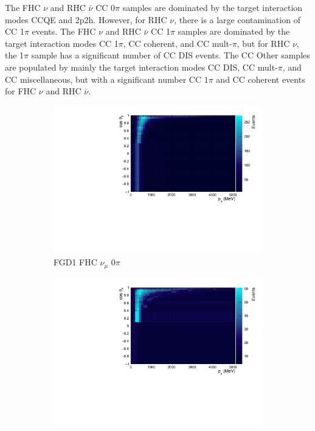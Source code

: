 The FHC $\nu$ and RHC $\bar{\nu}$ CC 0$\pi$ samples are dominated by the target interaction modes CCQE and 2p2h. However, for RHC $\nu$, there is a large contamination of CC 1$\pi$ events. The FHC $\nu$ and RHC $\bar{\nu}$ CC 1$\pi$ samples are dominated by the target interaction modes CC 1$\pi$, CC coherent, and CC mult-$\pi$, but for RHC $\nu$, the 1$\pi$ sample has a significant number of CC DIS events. The CC Other samples are populated by mainly the target interaction modes CC DIS, CC mult-$\pi$, and CC miscellaneous, but with a significant number CC $1\pi$ and CC coherent events for FHC $\nu$ and RHC $\bar{\nu}$.

\begin{figure}[!htbp]
\centering
\begin{subfigure}{.32\textwidth}
  \centering
  \includegraphics[width=0.95\linewidth]{figs/TH2PolyNom_MC_FGD1_numuCC_0pi}
  \caption{FGD1 FHC $\nu_{\mu}$ 0$\pi$}
  \label{fig:th2polynomFGD1_numuCC_0pi}
\end{subfigure}
\begin{subfigure}{.32\textwidth}
  \centering
  \includegraphics[width=0.95\linewidth]{figs/TH2PolyNom_MC_FGD1_numuCC_1pi}

\end{subfigure}
\end{figure}
